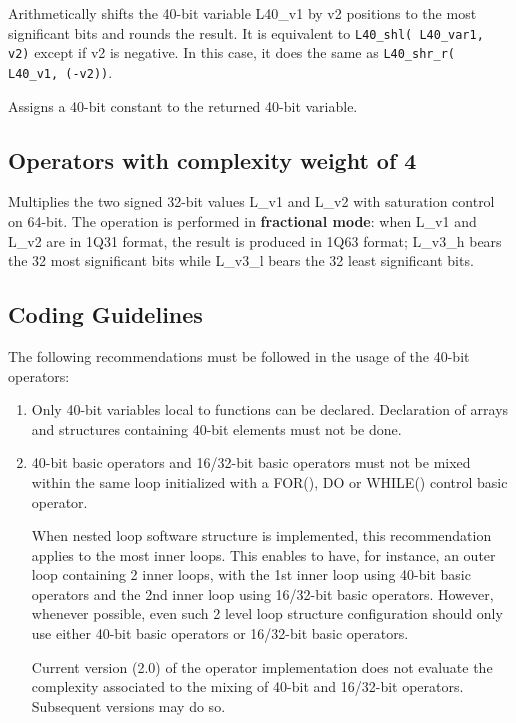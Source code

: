 \newpage
{}

Arithmetically shifts the 40-bit variable L40\_v1 by v2 positions
to the most significant bits and rounds the result. It is
equivalent to {\tt L40\_shl( L40\_var1, v2)} except if v2 is negative.
In this case, it does the same as {\tt L40\_shr\_r( L40\_v1, (-v2))}.


Assigns a 40-bit constant to the returned 40-bit variable.

\subsection{Operators with complexity weight of 4}


Multiplies the two signed 32-bit values L\_v1 and L\_v2 with saturation
control on 64-bit. The operation is performed in \textbf{fractional
mode}: when L\_v1 and L\_v2 are in 1Q31 format, the result is produced
in 1Q63 format; L\_v3\_h bears the 32 most significant bits while
L\_v3\_l bears the 32 least significant bits.

\subsection{Coding Guidelines}

The following recommendations must be followed in the usage of the
40-bit operators:
\begin{enumerate}
\item Only 40-bit variables local to functions can be declared.
Declaration of arrays and structures containing 40-bit elements
must not be done.
\item 40-bit basic operators and 16/32-bit basic
operators must not be mixed within the same loop initialized with
a FOR(), DO or WHILE() control basic operator.

When nested loop software structure is implemented, this
recommendation applies to the most inner loops. This enables to
have, for instance, an outer loop containing 2 inner loops, with
the 1st inner loop using 40-bit basic operators and the 2nd inner
loop using 16/32-bit basic operators. However, whenever possible,
even such 2 level loop structure configuration should only use
either 40-bit basic operators or 16/32-bit basic operators.

Current version (2.0) of the operator implementation does not
evaluate the complexity associated to the mixing of 40-bit and
16/32-bit operators. Subsequent versions may do so.
\end{enumerate}

